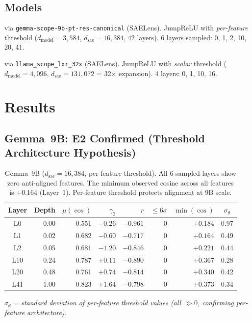 \documentclass[11pt,a4paper]{article}
\begin{document}
\subsection{Models}

\begin{description}[nosep, leftmargin=1em]
  \item[Gemma~9B] via \texttt{gemma-scope-9b-pt-res-canonical} (SAELens). JumpReLU with \emph{per-feature} threshold ($d_\text{model}=3{,}584$, $d_\text{sae}=16{,}384$, 42 layers). 6 layers sampled: 0, 1, 2, 10, 20, 41.
  \item[Llama~32x] via \texttt{llama\_scope\_lxr\_32x} (SAELens). JumpReLU with \emph{scalar} threshold ($d_\text{model}=4{,}096$, $d_\text{sae}=131{,}072$ = 32$\times$ expansion). 4 layers: 0, 1, 10, 16.
\end{description}

\section{Results}

\subsection{Gemma~9B: E2 Confirmed (Threshold Architecture Hypothesis)}
\label{sec:gemma9b}

\begin{table}[H]
\centering
\caption{Gemma~9B ($d_\text{sae}=16{,}384$, per-feature threshold). All 6 sampled layers show zero anti-aligned features. The minimum observed cosine across all features is $+0.164$ (Layer~1). Per-feature threshold protects alignment at 9B scale.}
\label{tab:gemma9b}
\setlength{\tabcolsep}{5pt}
\begin{tabular}{@{}crrrrrrc@{}}
\toprule
Layer & Depth & $\mu(\cos)$ & $\gamma_2$ & $r$ & ${\leq}6\sigma$ & $\min(\cos)$ & $\sigma_\theta$ \\
\midrule
L0  & 0.00 & 0.551 & $-0.26$ & $-0.961$ & 0 & $+0.184$ & 0.97 \\
L1  & 0.02 & 0.682 & $-0.60$ & $-0.717$ & 0 & $+0.164$ & 0.49 \\
L2  & 0.05 & 0.681 & $-1.20$ & $-0.846$ & 0 & $+0.221$ & 0.44 \\
L10 & 0.24 & 0.787 & $+0.11$ & $-0.890$ & 0 & $+0.367$ & 0.28 \\
L20 & 0.48 & 0.761 & $+0.74$ & $-0.814$ & 0 & $+0.340$ & 0.42 \\
L41 & 1.00 & 0.823 & $+1.64$ & $-0.798$ & 0 & $+0.373$ & 0.34 \\
\bottomrule
\end{tabular}
\vspace{0.3em}

\small\textit{$\sigma_\theta$ = standard deviation of per-feature threshold values (all $\gg 0$, confirming per-feature architecture).}
\end{table}
\end{document}
